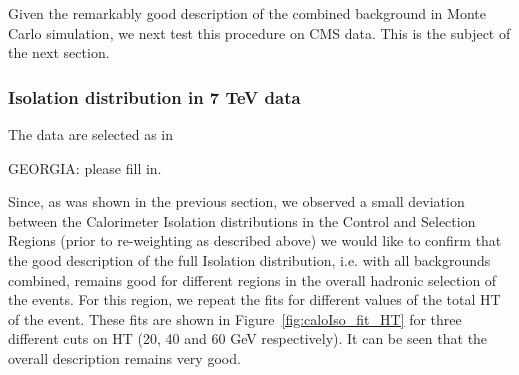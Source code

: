 Given the remarkably good description of the combined background in Monte Carlo simulation, we next test this procedure on CMS data.  This is the subject of the next section.

\subsubsection{Isolation distribution in 7 TeV data}

The data are selected as in

GEORGIA: please fill in.

Since, as was shown in the previous section, we observed a small deviation between the Calorimeter Isolation distributions in the Control and Selection Regions (prior to re-weighting as described above) we would like to confirm that the good description of the full Isolation distribution, i.e. with all backgrounds combined, remains good for different regions in the overall hadronic selection of the events.  For this region, we repeat the fits for different values of the total HT of the event.  These fits are shown in Figure~\ref{fig:caloIso_fit_HT} for three different cuts on HT (20, 40 and 60 GeV respectively).  It can be seen that the overall description remains very good.  


